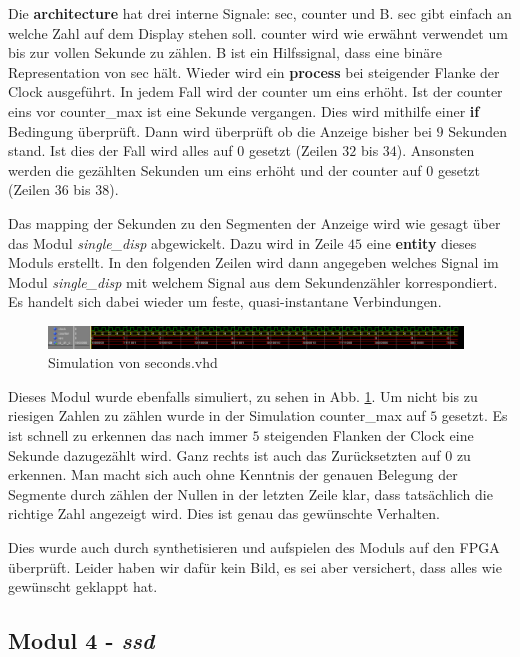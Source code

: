 Die \textbf{architecture} hat drei interne Signale: sec, counter und B.
sec gibt einfach an welche Zahl auf dem Display stehen soll.
counter wird wie erwähnt verwendet um bis zur vollen Sekunde zu zählen.
B ist ein Hilfssignal, dass eine binäre Representation von sec hält.
Wieder wird ein \textbf{process} bei steigender Flanke der Clock ausgeführt.
In jedem Fall wird der counter um eins erhöht.
Ist der counter eins vor counter\_max ist eine Sekunde vergangen.
Dies wird mithilfe einer \textbf{if} Bedingung überprüft.
Dann wird überprüft ob die Anzeige bisher bei $9$ Sekunden stand.
Ist dies der Fall wird alles auf $0$ gesetzt (Zeilen $32$ bis $34$).
Ansonsten werden die gezählten Sekunden um eins erhöht und der counter auf $0$ gesetzt (Zeilen $36$ bis $38$).

Das mapping der Sekunden zu den Segmenten der Anzeige wird wie gesagt über das Modul \textit{single\_disp} abgewickelt.
Dazu wird in Zeile $45$ eine \textbf{entity} dieses Moduls erstellt.
In den folgenden Zeilen wird dann angegeben welches Signal im Modul \textit{single\_disp} mit welchem Signal aus dem Sekundenzähler korrespondiert.
Es handelt sich dabei wieder um feste, quasi-instantane Verbindungen.

\begin{figure}[ht]
	\centering
    \includegraphics[width=0.98\textwidth]{../Daten/seconds2.png}
	\caption{Simulation von seconds.vhd}
	\label{img_seconds}
\end{figure}

Dieses Modul wurde ebenfalls simuliert, zu sehen in Abb. \ref{img_seconds}.
Um nicht bis zu riesigen Zahlen zu zählen wurde in der Simulation counter\_max auf $5$ gesetzt.
Es ist schnell zu erkennen das nach immer $5$ steigenden Flanken der Clock eine Sekunde dazugezählt wird.
Ganz rechts ist auch das Zurücksetzten auf $0$ zu erkennen.
Man macht sich auch ohne Kenntnis der genauen Belegung der Segmente durch zählen der Nullen in der letzten Zeile klar, dass tatsächlich die richtige Zahl angezeigt wird.
Dies ist genau das gewünschte Verhalten.

Dies wurde auch durch synthetisieren und aufspielen des Moduls auf den FPGA überprüft.
Leider haben wir dafür kein Bild, es sei aber versichert, dass alles wie gewünscht geklappt hat.

\subsection{Modul 4 - \textit{ssd}}
